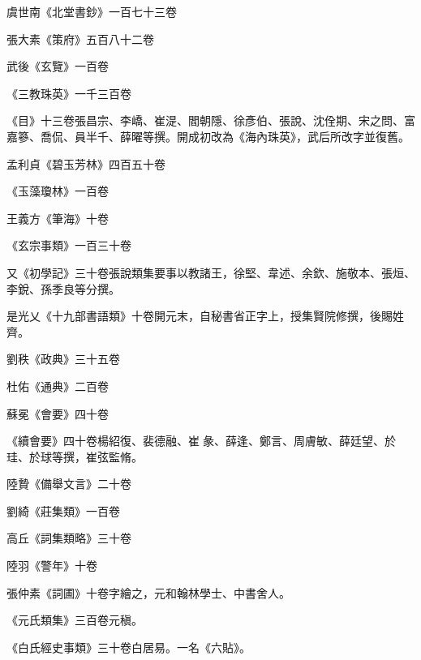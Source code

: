 \begin{pinyinscope}
 虞世南《北堂書鈔》一百七十三卷



 張大素《策府》五百八十二卷



 武後《玄覽》一百卷



 《三教珠英》一千三百卷



 《目》十三卷張昌宗、李嶠、崔湜、閻朝隱、徐彥伯、張說、沈佺期、宋之問、富嘉篸、喬侃、員半千、薛曜等撰。開成初改為《海內珠英》，武后所改字並復舊。



 孟利貞《碧玉芳林》四百五十卷



 《玉藻瓊林》一百卷



 王義方《筆海》十卷



 《玄宗事類》一百三十卷



 又《初學記》三十卷張說類集要事以教諸王，徐堅、韋述、余欽、施敬本、張烜、李銳、孫季良等分撰。



 是光乂《十九部書語類》十卷開元末，自秘書省正字上，授集賢院修撰，後賜姓齊。



 劉秩《政典》三十五卷



 杜佑《通典》二百卷



 蘇冕《會要》四十卷



 《續會要》四十卷楊紹復、裴德融、崔彖、薛逢、鄭言、周膚敏、薛廷望、於珪、於球等撰，崔弦監脩。



 陸贄《備舉文言》二十卷



 劉綺《莊集類》一百卷



 高丘《詞集類略》三十卷



 陸羽《警年》十卷



 張仲素《詞圃》十卷字繪之，元和翰林學士、中書舍人。



 《元氏類集》三百卷元稹。



 《白氏經史事類》三十卷白居易。一名《六貼》。




\end{pinyinscope}
